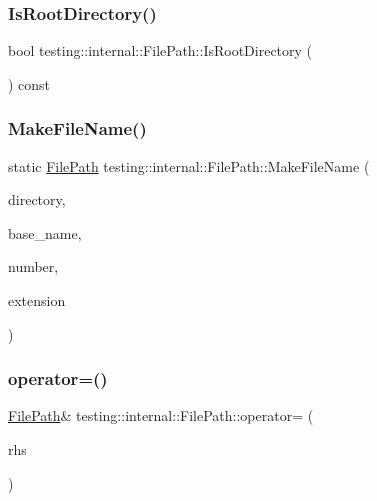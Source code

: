 \subsubsection{\texorpdfstring{IsRootDirectory()}{IsRootDirectory()}}
{\footnotesize\ttfamily bool testing\+::internal\+::\+File\+Path\+::\+Is\+Root\+Directory (\begin{DoxyParamCaption}{ }\end{DoxyParamCaption}) const}

\mbox{\label{classtesting_1_1internal_1_1_file_path_a1e7793eaae21c6629afe8be11064b111}} 
\subsubsection{\texorpdfstring{MakeFileName()}{MakeFileName()}}
{\footnotesize\ttfamily static \mbox{\hyperlink{classtesting_1_1internal_1_1_file_path}{File\+Path}} testing\+::internal\+::\+File\+Path\+::\+Make\+File\+Name (\begin{DoxyParamCaption}\item[{const \mbox{\hyperlink{classtesting_1_1internal_1_1_file_path}{File\+Path}} \&}]{directory,  }\item[{const \mbox{\hyperlink{classtesting_1_1internal_1_1_file_path}{File\+Path}} \&}]{base\+\_\+name,  }\item[{int}]{number,  }\item[{const char $\ast$}]{extension }\end{DoxyParamCaption})\hspace{0.3cm}{\ttfamily [static]}}

\mbox{\label{classtesting_1_1internal_1_1_file_path_a8d9c1bafb90f10bcd5611a54d8f326ef}} 
\subsubsection{\texorpdfstring{operator=()}{operator=()}}
{\footnotesize\ttfamily \mbox{\hyperlink{classtesting_1_1internal_1_1_file_path}{File\+Path}}\& testing\+::internal\+::\+File\+Path\+::operator= (\begin{DoxyParamCaption}\item[{const \mbox{\hyperlink{classtesting_1_1internal_1_1_file_path}{File\+Path}} \&}]{rhs }\end{DoxyParamCaption})\hspace{0.3cm}{\ttfamily [inline]}}

